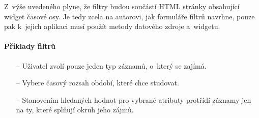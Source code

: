 			Z~výše uvedeného plyne, že filtry budou součástí HTML stránky obsahující widget časové osy. Je tedy zcela na autorovi, jak formuláře filtrů navrhne, pouze pak k~jejich aplikaci musí použít metody datového zdroje a~widgetu.
			
			\paragraph{Příklady filtrů}
			\begin{itemize}
				\item[--] Uživatel zvolí pouze jeden typ záznamů, o~který se zajímá.
				\item[--] Vybere časový rozsah období, které chce studovat.
				\item[--] Stanovením hledaných hodnot pro vybrané atributy protřídí zá\-znamy jen na ty, které splňují okruh jeho zájmů.
			\end{itemize}
			